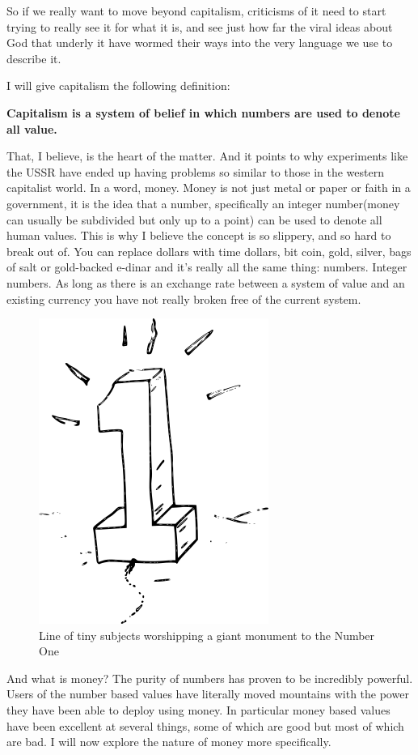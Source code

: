 So if we really want to move beyond capitalism, criticisms of it need to
start trying to really see it for what it is, and see just how far the
viral ideas about God that underly it have wormed their ways into the
very language we use to describe it.

I will give capitalism the following definition:

\textbf{Capitalism is a system of belief in which numbers are used to
denote all value.}

That, I believe, is the heart of the matter. And it points to why
experiments like the USSR have ended up having problems so similar to
those in the western capitalist world. In a word, money. Money is not
just metal or paper or faith in a government, it is the idea that a
number, specifically an integer number(money can usually be subdivided
but only up to a point) can be used to denote all human values. This is
why I believe the concept is so slippery, and so hard to break out of.
You can replace dollars with time dollars, bit coin, gold, silver, bags
of salt or gold-backed e-dinar and it's really all the same thing:
numbers. Integer numbers. As long as there is an exchange rate between a
system of value and an existing currency you have not really broken free
of the current system.

\begin{figure}[htbp]
\centering
\includegraphics{images/bigone.png}
\caption{Line of tiny subjects worshipping a giant monument to the
Number One}
\end{figure}

And what is money? The purity of numbers has proven to be incredibly
powerful. Users of the number based values have literally moved
mountains with the power they have been able to deploy using money. In
particular money based values have been excellent at several things,
some of which are good but most of which are bad. I will now explore the
nature of money more specifically.

